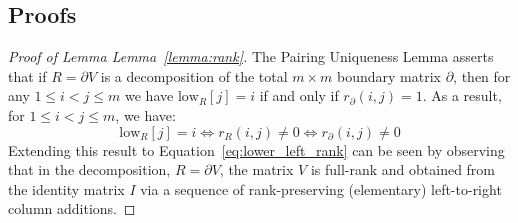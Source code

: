 \documentclass[pdflatex,sn-mathphys-num]{sn-jnl}
\begin{document}
\begin{appendices}

\section{}\label{sec:appendix}

\subsection{Proofs}\label{sec:proofs}

\begin{proof}[Proof of Lemma Lemma~\ref{lemma:rank}]
	\setlength{\abovedisplayskip}{1em}
	\setlength{\belowdisplayskip}{1em}
	The Pairing Uniqueness Lemma\cite{edelsbrunner2000topological} asserts that if $R = \partial V$ is a decomposition of the total $m \times m$ boundary matrix $\partial$, then for any $1 \leq i < j \leq m$ we have $\mathrm{low}_R [j] = i$ if and only if $r_\partial (i , j) = 1$. As a result, for $1 \leq i < j \leq m$, we have: 
\[
	\mathrm{low}_R [j] = i \Leftrightarrow r_R (i , j) \neq 0 \Leftrightarrow r_\partial (i , j) \neq 0
\]
Extending this result to Equation~\ref{eq:lower_left_rank} can be seen by observing that in the decomposition, $R = \partial V$, the matrix $V$ is full-rank and obtained from the identity matrix $I$ via a sequence of rank-preserving (elementary) left-to-right column additions.
\end{proof}


\end{appendices}
\end{document}
